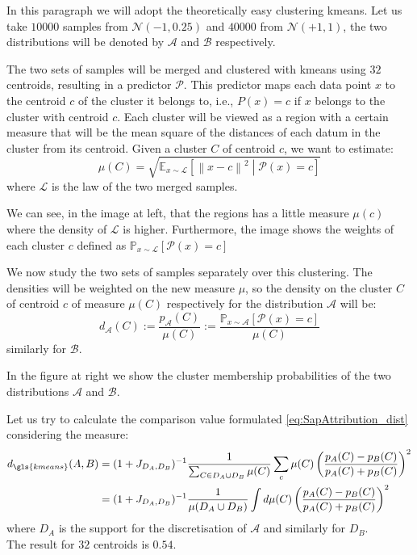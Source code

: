 \newpage
\begin{exempli_gratia}
	In this paragraph we will adopt the theoretically easy clustering \gls{kmeans}. Let us take $\num{10000}$ samples from $\mathcal{N}(-1,0.25)$ and $\num{40000}$ from $\mathcal{N}(+1,1)$, the two distributions will be denoted by $\mathcal{A}$ and $\mathcal{B}$ respectively.

	\begin{modified}
	\noindent The two sets of samples will be merged and clustered with \gls{kmeans} using $32$ centroids, resulting in a predictor $\mathcal{P}$. This predictor maps each data point $x$ to the centroid $c$ of the cluster it belongs to, i.e., $P(x)=c$ if $x$ belongs to the cluster with centroid $c$. Each cluster will be viewed as a region with a certain measure that will be the mean square of the distances of each datum in the cluster from its centroid. Given a cluster $C$ of centroid $c$, we want to estimate:
	\[
		\mu(C)=\sqrt{\mathbb{E}_{x\sim\mathcal{L}}\left[\left\|x-c\right\|^2\middle|\mathcal{P}\left(x\right)=c\right]}
	\]
	where $\mathcal{L}$ is the law of the two merged samples.

	\noindent We can see, in the image at left, that the regions has a little measure $\mu(c)$ where the density of $\mathcal{L}$ is higher. Furthermore, the image shows the weights of each cluster $c$ defined as  $\mathbb{P}_{x\sim\mathcal{L}}\left[\mathcal{P}(x)=c\right]$

	\noindent We now study the two sets of samples separately over this clustering. The densities will be weighted on the new measure $\mu$, so the density on the cluster $C$ of centroid $c$ of measure $\mu(C)$ respectively for the distribution $\mathcal{A}$ will be:
	\[
	d_\mathcal{A}(C):=\frac{p_\mathcal{A}(C)}{\mu(C)} := \frac{\mathbb{P}_{x\sim\mathcal{A}}\left[\mathcal{P}(x)=c\right]}{\mu(C)}
	\]
	similarly for $\mathcal{B}$.

	\noindent In the figure at right we show the cluster membership probabilities of the two distributions $\mathcal{A}$ and $\mathcal{B}$.

	\noindent Let us try to calculate the comparison value formulated \cref{eq:SapAttribution_dist} considering the measure:
	\begin{align*}
		d_{\gls{kmeans}}(A,B)&=(1+J_{D_A,D_B})^{-1}\frac{1}{\sum_{C\in D_A\cup D_B}\mu(C)}\sum_c \mu(C)\left(\frac{p_A(C)-p_B(C)}{p_A(C)+p_B(C)}\right)^2 \\
		&= (1+J_{D_A,D_B})^{-1}\frac{1}{\mu(D_A\cup D_B)}\int d\mu(C) \left(\frac{p_A(C)-p_B(C)}{p_A(C)+p_B(C)}\right)^2
	\end{align*}
	where $D_A$ is the support for the discretisation of ${\mathcal{A}}$ and similarly for $D_B$.\\ The result for $32$ centroids is $0.54$.


\end{modified}
\end{exempli_gratia}
